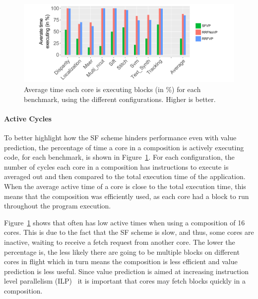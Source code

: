 \begin{figure}[t]
    \centering
    \includegraphics[width=1\textwidth]{chapter3/graphics/perf_av_cycle_exec4.pdf}
    \caption{Average time each core is executing blocks (in \%) for each benchmark, using the different configurations. Higher is better.}
    \label{fig:perf_av_cycle}
	\vspace{1em}
\end{figure}

\paragraph*{Active Cycles}
To better highlight how the SF scheme hinders performance even with value prediction, the percentage of time a core in a composition is actively executing code, for each benchmark, is shown in Figure~\ref{fig:perf_av_cycle}.
For each configuration, the number of cycles each core in a composition has instructions to execute is averaged out and then compared to the total execution time of the application.
When the average active time of a core is close to the total execution time, this means that the composition was efficiently used, as each core had a block to run throughout the program execution.

Figure~\ref{fig:perf_av_cycle} shows that \vp{} often has low active times when using a composition of 16 cores.
This is due to the fact that the SF scheme is slow, and thus, some cores are inactive, waiting to receive a fetch request from another core.
The lower the percentage is, the less likely there are going to be multiple blocks on different cores in flight which in turn means the composition is less efficient and value prediction is less useful.
Since value prediction is aimed at increasing instruction level parallelism (ILP)~\cite{peraisBeBop2015} it is important that cores may fetch blocks quickly in a composition.



